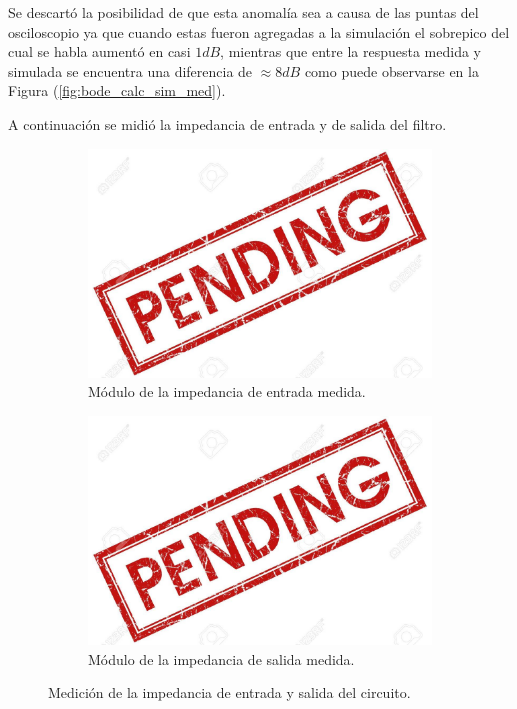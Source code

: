 Se descartó la posibilidad de que esta anomalía sea a causa de las puntas del osciloscopio ya que cuando estas fueron agregadas a la simulación el sobrepico del cual se habla aumentó en casi $1dB$, mientras que entre la respuesta medida y simulada se encuentra una diferencia de $\approx 8dB$ como puede observarse en la Figura (\ref{fig:bode_calc_sim_med}).

A continuación se midió la impedancia de entrada y de salida del filtro.

\begin{figure}[H]
	\centering
	\begin{subfigure}[t]{0.49\textwidth}
	\centering
		\includegraphics[width=1.1\textwidth]{Imagenes/pend.jpg}
		\caption{Módulo de la impedancia de entrada medida.}
	\end{subfigure}
	\begin{subfigure}[t]{0.49\textwidth}
	\centering
		\includegraphics[width=1.1\textwidth]{Imagenes/pend.jpg}
		\caption{Módulo de la impedancia de salida medida.}
	\end{subfigure}
	\label{fig:zin_zout}
	\caption{Medición de la impedancia de entrada y salida del circuito.}
\end{figure}

